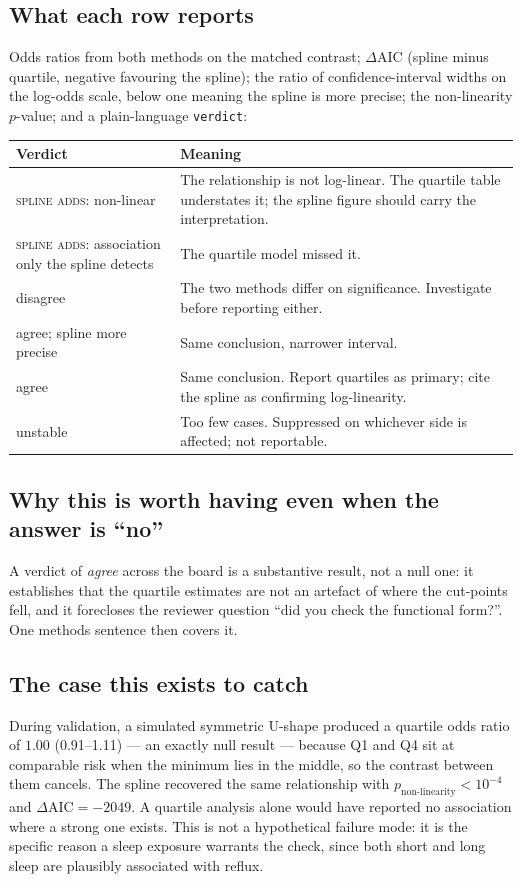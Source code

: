 \documentclass[11pt]{article}
\newcommand{\code}[1]{\texttt{\small #1}}
\begin{document}
\subsection{What each row reports} Odds ratios from both methods on the matched
contrast; $\Delta$AIC (spline minus quartile, negative favouring the spline);
the ratio of confidence-interval widths on the log-odds scale, below one meaning
the spline is more precise; the non-linearity $p$-value; and a plain-language
\code{verdict}:

\begin{table}[h]
\centering
\begin{tabular}{@{}l p{8.2cm}@{}}
\toprule
\textbf{Verdict} & \textbf{Meaning} \\
\midrule
\textsc{spline adds}: non-linear & The relationship is not log-linear. The quartile table understates it; the spline figure should carry the interpretation. \\
\textsc{spline adds}: association only the spline detects & The quartile model missed it. \\
disagree & The two methods differ on significance. Investigate before reporting either. \\
agree; spline more precise & Same conclusion, narrower interval. \\
agree & Same conclusion. Report quartiles as primary; cite the spline as confirming log-linearity. \\
unstable & Too few cases. Suppressed on whichever side is affected; not reportable. \\
\bottomrule
\end{tabular}
\end{table}

\subsection{Why this is worth having even when the answer is ``no''} A verdict of
\emph{agree} across the board is a substantive result, not a null one: it
establishes that the quartile estimates are not an artefact of where the
cut-points fell, and it forecloses the reviewer question ``did you check the
functional form?''. One methods sentence then covers it.

\subsection{The case this exists to catch} During validation, a simulated
symmetric U-shape produced a quartile odds ratio of $1.00$ (0.91--1.11) --- an
exactly null result --- because Q1 and Q4 sit at comparable risk when the
minimum lies in the middle, so the contrast between them cancels. The spline
recovered the same relationship with $p_{\text{non-linearity}} < 10^{-4}$ and
$\Delta\mathrm{AIC} = -2049$. A quartile analysis alone would have reported no
association where a strong one exists. This is not a hypothetical failure mode:
it is the specific reason a sleep exposure warrants the check, since both short
and long sleep are plausibly associated with reflux.
\end{document}
